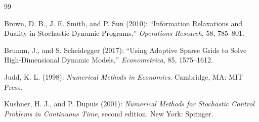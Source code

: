 \begin{thebibliography}{99}

Brown, D. B., J. E. Smith, and P. Sun (2010): ``Information Relaxations and Duality in Stochastic Dynamic Programs,'' \emph{Operations Research}, 58, 785--801.

Brumm, J., and S. Scheidegger (2017): ``Using Adaptive Sparse Grids to Solve High-Dimensional Dynamic Models,'' \emph{Econometrica}, 85, 1575--1612.

Judd, K. L. (1998): \emph{Numerical Methods in Economics}. Cambridge, MA: MIT Press.

Kushner, H. J., and P. Dupuis (2001): \emph{Numerical Methods for Stochastic Control Problems in Continuous Time}, second edition. New York: Springer.

\end{thebibliography}
